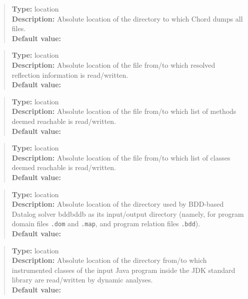 \begin{quote}
{\bf Type:} location \\
{\bf Description:} Absolute location of the directory to which Chord dumps all files. \\
{\bf Default value:} 
\end{quote}

\begin{quote}
{\bf Type:} location  \\
{\bf Description:} Absolute location of the file from/to which resolved reflection information is read/written. \\
{\bf Default value:} 
\end{quote}

\begin{quote}
{\bf Type:} location  \\
{\bf Description:} Absolute location of the file from/to which list of methods deemed reachable is read/written. \\
{\bf Default value:} 
\end{quote}

\begin{quote}
{\bf Type:} location  \\
{\bf Description:} Absolute location of the file from/to which list of classes deemed reachable is read/written.  \\
{\bf Default value:} 
\end{quote}

\begin{quote}
{\bf Type:} location \\
{\bf Description:} Absolute location of the directory used by BDD-based Datalog solver bddbddb as its input/output directory (namely, for program domain files {\tt *.dom} and {\tt *.map}, and program relation files {\tt *.bdd}). \\
{\bf Default value:} 
\end{quote}

\begin{quote}
{\bf Type:} location \\
{\bf Description:} Absolute location of the directory from/to which instrumented classes of the input Java program inside the JDK standard library are read/written by dynamic analyses. \\
{\bf Default value:} 
\end{quote}

